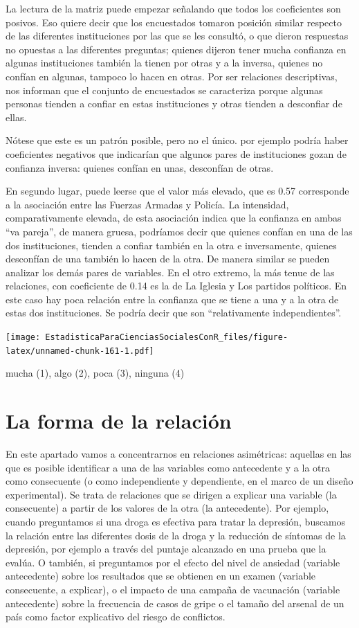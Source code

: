 \documentclass[]{book}
\begin{document}
La lectura de la matriz puede empezar señalando que todos los coeficientes son posivos. Eso quiere decir que los encuestados tomaron posición similar respecto de las diferentes instituciones por las que se les consultó, o que dieron respuestas no opuestas a las diferentes preguntas; quienes dijeron tener mucha confianza en algunas instituciones también la tienen por otras y a la inversa, quienes no confían en algunas, tampoco lo hacen en otras. Por ser relaciones descriptivas, nos informan que el conjunto de encuestados se caracteriza porque algunas personas tienden a confiar en estas instituciones y otras tienden a desconfiar de ellas.

Nótese que este es un patrón posible, pero no el único. por ejemplo podría haber coeficientes negativos que indicarían que algunos pares de instituciones gozan de confianza inversa: quienes confían en unas, desconfían de otras.

En segundo lugar, puede leerse que el valor más elevado, que es 0.57 corresponde a la asociación entre las Fuerzas Armadas y Policía. La intensidad, comparativamente elevada, de esta asociación indica que la confianza en ambas ``va pareja'', de manera gruesa, podríamos decir que quienes confían en una de las dos instituciones, tienden a confiar también en la otra e inversamente, quienes desconfían de una también lo hacen de la otra. De manera similar se pueden analizar los demás pares de variables.
En el otro extremo, la más tenue de las relaciones, con coeficiente de 0.14 es la de La Iglesia y Los partidos políticos. En este caso hay poca relación entre la confianza que se tiene a una y a la otra de estas dos instituciones. Se podría decir que son ``relativamente independientes''.

\texttt{[image: EstadisticaParaCienciasSocialesConR\_files/figure-latex/unnamed-chunk-161-1.pdf]}

mucha (1), algo (2), poca (3), ninguna (4)

\hypertarget{la-forma-de-la-relacion}{%
\section{La forma de la relación}\label{la-forma-de-la-relacion}}

En este apartado vamos a concentrarnos en relaciones asimétricas: aquellas en las que es posible identificar a una de las variables como antecedente y a la otra como consecuente (o como independiente y
dependiente, en el marco de un diseño experimental). Se trata de
relaciones que se dirigen a explicar una variable (la consecuente) a
partir de los valores de la otra (la antecedente). Por ejemplo, cuando preguntamos si una droga es efectiva para tratar la depresión, buscamos la relación entre las diferentes dosis de la droga y la reducción de síntomas de la depresión, por ejemplo a través del puntaje alcanzado en una prueba que la evalúa. O también, si preguntamos por el efecto del nivel de ansiedad (variable antecedente) sobre los resultados que se obtienen en un examen (variable consecuente, a explicar), o el impacto de una campaña de vacunación (variable antecedente) sobre la frecuencia de casos de gripe o el tamaño del arsenal de un país como factor explicativo del riesgo de conflictos.
\end{document}
